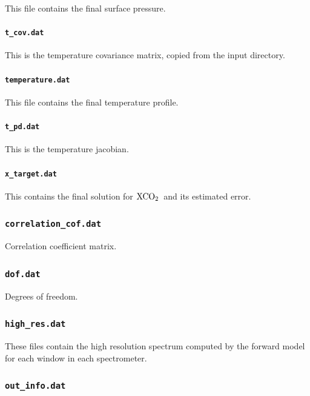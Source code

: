 \documentclass{article}
\newcommand{\XCOtwo}{\ensuremath{\rm{XCO}_2}}
\begin{document}
This file contains the final surface pressure.

\paragraph{\texttt{t\_cov.dat}}

This is the temperature covariance matrix, copied from the
input directory.

\paragraph{\texttt{temperature.dat}}

This file contains the final temperature profile.

\paragraph{\texttt{t\_pd.dat}}

This is the temperature jacobian.

\paragraph{\texttt{x\_target.dat}}

This contains the final solution for \XCOtwo\ and its estimated error.

\subsubsection{\texttt{correlation\_cof.dat}}

Correlation coefficient matrix.

\subsubsection{\texttt{dof.dat}}

Degrees of freedom.

\subsubsection{\texttt{high\_res.dat}}

These files contain the high resolution spectrum computed by the
forward model for each window in each spectrometer.

\subsubsection{\texttt{out\_info.dat}}
\end{document}
